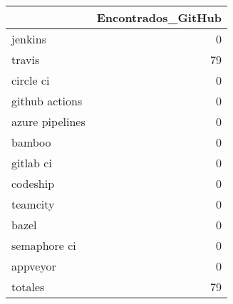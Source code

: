 \begin{tabular}{lr}
\toprule
{} &  Encontrados\_GitHub \\
\midrule
jenkins         &                   0 \\
travis          &                  79 \\
circle ci       &                   0 \\
github actions  &                   0 \\
azure pipelines &                   0 \\
bamboo          &                   0 \\
gitlab ci       &                   0 \\
codeship        &                   0 \\
teamcity        &                   0 \\
bazel           &                   0 \\
semaphore ci    &                   0 \\
appveyor        &                   0 \\
totales         &                  79 \\
\bottomrule
\end{tabular}

